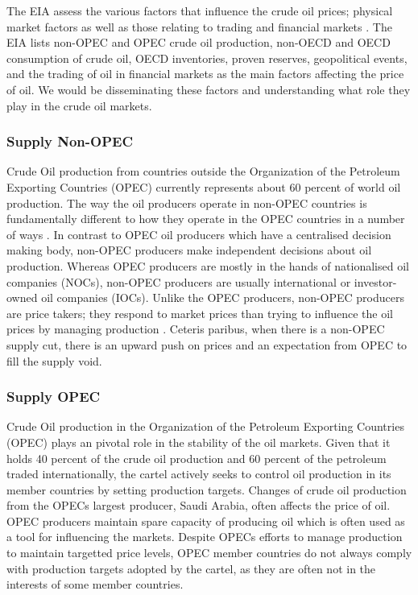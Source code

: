 The EIA assess the various factors that influence the crude oil prices; physical market factors as well as those relating to trading and financial markets \cite{eiacrude}. The EIA lists non-OPEC and OPEC crude oil production, non-OECD and OECD consumption of crude oil, OECD inventories, proven reserves, geopolitical events, and the trading of oil in financial markets as the main factors affecting the price of oil. We would be disseminating these factors and understanding what role they play in the crude oil markets. \\

\subsubsection{Supply Non-OPEC}

Crude Oil production from countries outside the Organization of the Petroleum Exporting Countries (OPEC) currently represents about 60 percent of world oil production. The way the oil producers operate in non-OPEC countries is fundamentally different to how they operate in the OPEC countries in a number of ways \cite{nonopec}. In contrast to OPEC oil producers which have a centralised decision making body, non-OPEC producers make independent decisions about oil production. Whereas OPEC producers are mostly in the hands of nationalised oil companies (NOCs), non-OPEC producers are usually international or investor-owned oil companies (IOCs). Unlike the OPEC producers, non-OPEC producers are price takers; they respond to market prices than trying to influence the oil prices by managing production \cite{opecshort}. Ceteris paribus, when there is a non-OPEC supply cut, there is an upward push on prices and an expectation from OPEC to fill the supply void. \\

\subsubsection{Supply OPEC}

Crude Oil production \citep{opec} in the Organization of the Petroleum Exporting Countries (OPEC) \citep{opec} plays an pivotal role \citep{opecsmarketrole} in the stability of the oil markets. Given that it holds 40 percent of the crude oil production and 60 percent of the petroleum traded internationally, the cartel actively seeks to control oil production in its member countries by setting production targets. Changes of crude oil production from the OPECs largest producer, Saudi Arabia, often affects the price of oil. OPEC producers maintain spare capacity of producing oil which is often used as a tool for influencing the markets. Despite OPECs efforts to manage production to maintain targetted price levels, OPEC member countries do not always comply with production targets adopted by the cartel, as they are often not in the interests of some member countries. \\

